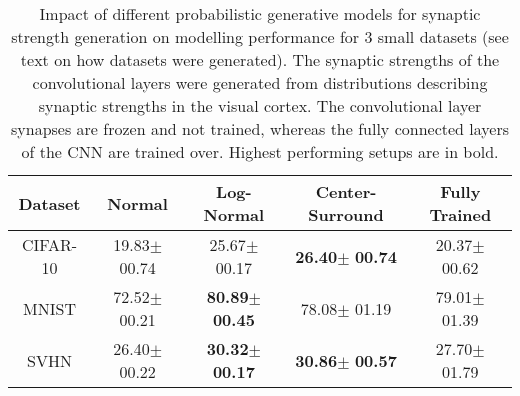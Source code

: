 \documentclass[10pt,letterpaper]{article}
\newcommand{\oo}[2]{#1{\tiny $\pm$ #2}}
\newcommand{\bo}[2]{\textbf{#1}{\tiny $\pm$ \textbf{#2}}}
\begin{document}
\begin{table*}
  \caption{Impact of different probabilistic generative models for synaptic strength generation on modelling performance for 3 small datasets (see text on how datasets were generated). The synaptic strengths of the convolutional layers were generated from distributions describing synaptic strengths in the visual cortex. The convolutional layer synapses are frozen and not trained, whereas the fully connected layers of the CNN are trained over. Highest performing setups are in bold.
  }
  \label{results_summary}
  \centering
  \begin{tabular}{c|cccc}
    \hline
    Dataset  & Normal                      & Log-Normal                  & Center-Surround             & Fully Trained              \\

    \hline

    CIFAR-10 & \oo{19.83}{00.74}           & \oo{25.67}{00.17}           & \bo{26.40}{00.74}           & \oo{20.37}{00.62}          \\ %
    MNIST    & \oo{72.52}{00.21}           & \bo{80.89}{00.45}           & \oo{78.08}{01.19}           & \oo{79.01}{01.39}          \\ %
    SVHN     & \oo{26.40}{00.22}           & \bo{30.32}{00.17}           & \bo{30.86}{00.57}           & \oo{27.70}{01.79}          \\ %

    \hline
  \end{tabular}
  \vspace{-5mm}
\end{table*}
\end{document}
